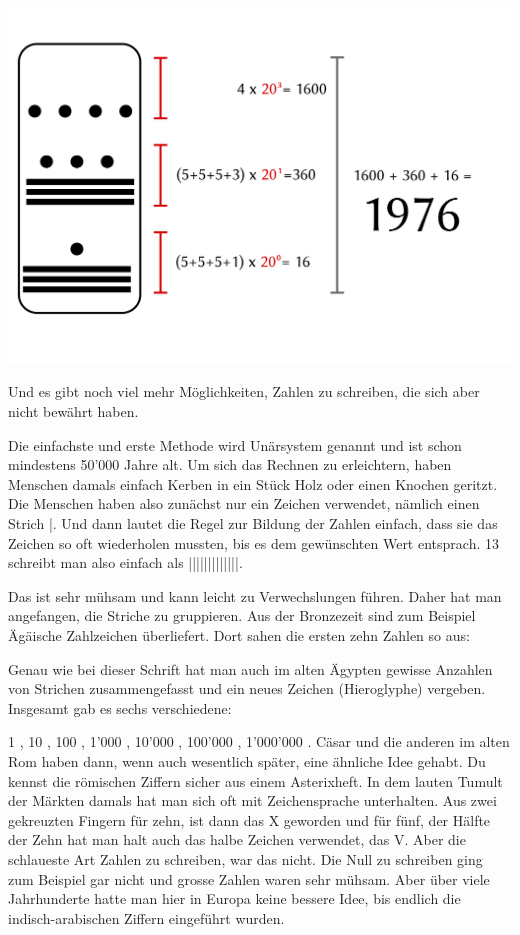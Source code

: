 \includegraphics[width=\textwidth]{./bilder/Maya1976.png}

Und es gibt noch viel mehr Möglichkeiten, Zahlen zu schreiben, die sich aber nicht bewährt haben.

Die einfachste und erste Methode wird Unärsystem genannt und ist schon mindestens 50'000 Jahre alt. Um sich das Rechnen zu erleichtern, haben Menschen damals einfach Kerben in ein Stück Holz oder einen Knochen geritzt. Die Menschen haben also zunächst nur ein Zeichen verwendet, nämlich einen Strich |. Und dann lautet die Regel zur Bildung der Zahlen einfach, dass sie das Zeichen so oft wiederholen mussten, bis es dem gewünschten Wert entsprach. 13 schreibt man also einfach als |||||||||||||.

Das ist sehr mühsam und kann leicht zu Verwechslungen führen. Daher hat man angefangen, die Striche zu gruppieren. Aus der Bronzezeit sind zum Beispiel Ägäische Zahlzeichen überliefert. Dort sahen die ersten zehn Zahlen so aus:

Genau wie bei dieser Schrift hat man auch im alten Ägypten gewisse Anzahlen von Strichen zusammengefasst und ein neues Zeichen (Hieroglyphe) vergeben. Insgesamt gab es sechs verschiedene:

1 \textpmhg{\Hone}, 10 , 100 , 1’000 , 10’000 , 100’000 , 1'000’000 . Cäsar und die anderen im alten Rom haben dann, wenn auch wesentlich später, eine ähnliche Idee gehabt. Du kennst die römischen Ziffern sicher aus einem Asterixheft. In dem lauten Tumult der Märkten damals hat man sich oft mit Zeichensprache unterhalten. Aus zwei gekreuzten Fingern für zehn, ist dann das X geworden und für fünf, der Hälfte der Zehn hat man halt auch das halbe Zeichen verwendet, das V. Aber die schlaueste Art Zahlen zu schreiben, war das nicht. Die Null zu schreiben ging zum Beispiel gar nicht und grosse Zahlen waren sehr mühsam. Aber über viele Jahrhunderte hatte man hier in Europa keine bessere Idee, bis endlich die indisch-arabischen Ziffern eingeführt wurden.

